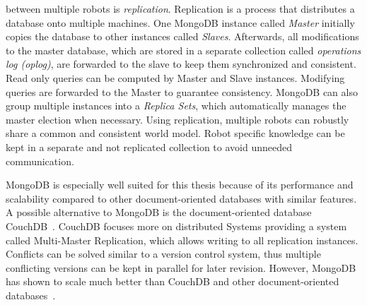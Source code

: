 \documentclass[a4paper,11pt]{article}
\begin{document}
between multiple robots is \emph{replication}. Replication is a
process that distributes a database onto multiple machines.
One MongoDB instance called \emph{Master} initially
copies the database  to other instances called \emph{Slaves}.
Afterwards, all modifications to the master database, which are
stored in a separate collection called \emph{operations log (oplog)}, are forwarded to
the slave to keep them synchronized and consistent.
Read only queries can be
computed by Master and Slave instances. Modifying queries are
forwarded to the Master to guarantee consistency.
MongoDB can also group multiple
instances into a \emph{Replica Sets}, which automatically manages
the master election when necessary. Using replication,
multiple robots can robustly share a common and consistent world
model. Robot specific knowledge can be kept in a separate and not
replicated collection to avoid unneeded communication.

MongoDB is especially well suited for this thesis because of its
performance and scalability compared to other document-oriented
databases with similar features. A possible alternative to MongoDB is
the document-oriented database CouchDB~\cite{CouchDB}. CouchDB
focuses more on distributed Systems providing a system called
Multi-Master Replication, which allows writing to all replication instances.
Conflicts can be solved similar to a version
control system, thus multiple conflicting versions can be kept in
parallel for later revision. However, MongoDB has shown to scale much
better than CouchDB and other document-oriented databases~\cite{db-comparison}.
\end{document}
